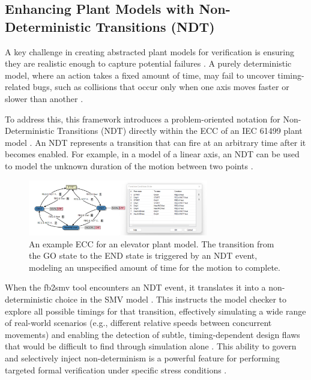 \subsection{Enhancing Plant Models with Non-Deterministic Transitions (NDT)}

A key challenge in creating abstracted plant models for verification is ensuring they are realistic enough to capture potential failures \cite{patil2011closed}. A purely deterministic model, where an action takes a fixed amount of time, may fail to uncover timing-related bugs, such as collisions that occur only when one axis moves faster or slower than another \cite{patil2015counterexample}.

To address this, this framework introduces a problem-oriented notation for Non-Deterministic Transitions (NDT) directly within the ECC of an IEC 61499 plant model \cite{xavier2021cyber}. An NDT represents a transition that can fire at an arbitrary time after it becomes enabled. For example, in a model of a linear axis, an NDT can be used to model the unknown duration of the motion between two points \cite{toolchain}.

\begin{figure}[h]
\centering
\includegraphics[width=0.7\textwidth]{chapters/images/chapter2/ECC-moniteur.png}
\caption{An example ECC for an elevator plant model. The transition from the GO state to the END state is triggered by an NDT event, modeling an unspecified amount of time for the motion to complete.}
\label{fig:ecc_ndt}
\end{figure}

When the fb2smv tool encounters an NDT event, it translates it into a non-deterministic choice in the SMV model \cite{drozdov2016formal}. This instructs the model checker to explore all possible timings for that transition, effectively simulating a wide range of real-world scenarios (e.g., different relative speeds between concurrent movements) and enabling the detection of subtle, timing-dependent design flaws that would be difficult to find through simulation alone \cite{patil2015counterexample}. This ability to govern and selectively inject non-determinism is a powerful feature for performing targeted formal verification under specific stress conditions \cite{patil2011closed}.


